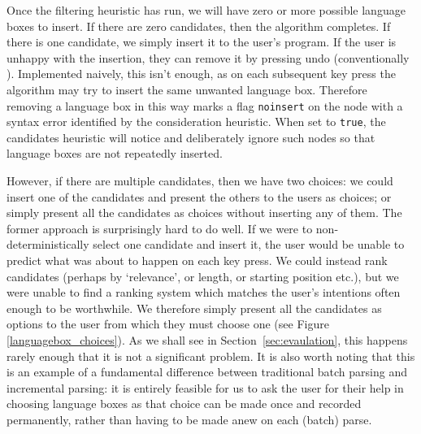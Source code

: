 \documentclass[sigplan,screen]{acmart}\settopmatter{printfolios=true,printccs=false,printacmref=false}
\begin{document}
Once the filtering heuristic has run, we will have zero or more possible
language boxes to insert. If there are zero candidates, then the algorithm
completes. If there is one candidate, we simply insert it to the user's
program. If the user is unhappy with the insertion, they can remove it by
pressing undo (conventionally ). Implemented naively, this isn't
enough, as on each subsequent key press the algorithm may try to insert the
same unwanted language box. Therefore removing a language box in this way marks
a flag \texttt{noinsert} on the node with a syntax error identified by the
consideration heuristic. When set to \texttt{true}, the candidates heuristic
will notice and deliberately ignore such nodes so that language boxes are not
repeatedly inserted.

However, if there are multiple candidates, then we have two choices: we could
insert one of the candidates and present the others to the users as choices; or
simply present all the candidates as choices without inserting
any of them. The former approach is surprisingly hard to do well. If we were to
non-deterministically select one candidate and insert it, the user would be
unable to predict what was about to happen on each key press. We could instead
rank candidates (perhaps by `relevance', or length, or starting position etc.),
but we were unable to find a ranking system which matches the user's intentions
often enough to be worthwhile. We therefore simply present all the candidates
as options to the user from which they must choose one (see Figure \ref{languagebox_choices}). As we shall see in
Section~\ref{sec:evaulation}, this happens rarely enough that it is not a
significant problem. It is also worth noting that this is an
example of a fundamental difference between traditional batch parsing and
incremental parsing: it is entirely feasible for us
to ask the user for their help in choosing language boxes as that choice can
be made once and recorded permanently, rather than having to be made anew
on each (batch) parse.
\end{document}
